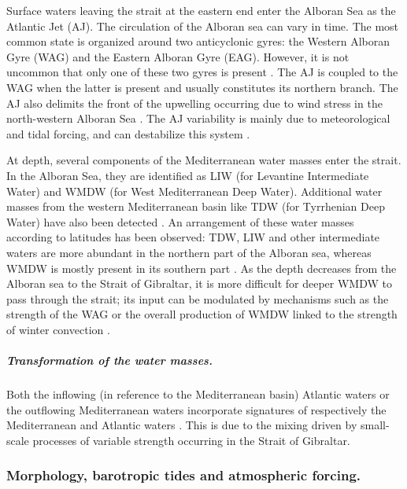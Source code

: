 Surface waters leaving the strait at the eastern end enter the Alboran Sea as the Atlantic Jet (AJ). The circulation of the Alboran sea can vary in time. The most common state is organized around two anticyclonic gyres: the Western Alboran Gyre (WAG) and the Eastern Alboran Gyre (EAG). However, it is not uncommon that only one of these two gyres is present \citep{heburn_1990}. The AJ is coupled to the WAG when the latter is present and usually constitutes its northern branch. The AJ also delimits the front of the upwelling occurring due to wind stress in the north-western Alboran Sea \citep{sarhan_2000}. The AJ variability is mainly due to meteorological and tidal forcing, and can destabilize this system \citep{sanchez-garrido_2013,lorente_2019}.

At depth, several components of the Mediterranean water masses enter the strait. In the Alboran Sea, they are identified as LIW (for Levantine Intermediate Water) and WMDW (for West Mediterranean Deep Water).  Additional water masses from the western Mediterranean basin like TDW (for Tyrrhenian Deep Water) have also been detected \citep{Millot2014}. An arrangement of these water masses according to latitudes has been observed: TDW, LIW and other intermediate waters are more abundant in the northern part of the Alboran sea, whereas WMDW is mostly present in its southern part \citep{Millot2014}. As the depth decreases from the Alboran sea to the Strait of Gibraltar, it is more difficult for deeper WMDW to pass through the strait; its input can be modulated by mechanisms such as the strength of the WAG or the overall production of WMDW linked to the strength of winter convection \citep{naranjo_2012}.

\subparagraph{Transformation of the water masses.}
Both the inflowing (in reference to the Mediterranean basin) Atlantic waters or the outflowing Mediterranean waters incorporate signatures of respectively the Mediterranean \citep{macias_2006} and Atlantic waters \citep{millot_2007,GarciaLafuente2011}. This is due to the mixing driven by small-scale processes of variable strength occurring in the Strait of Gibraltar.  


\subsubsection{Morphology, barotropic tides and atmospheric forcing.} 

